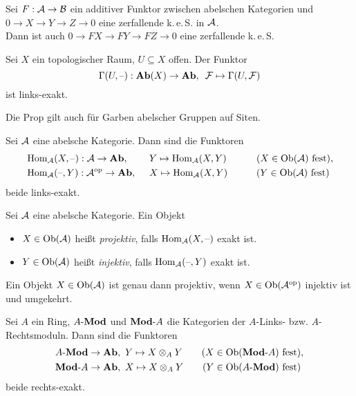\documentclass{cheat-sheet}
\newcommand{\keS}{k.\,e.\,S.} %
\begin{document}
\begin{prop}
  Sei $F : \mathcal{A} \to \mathcal{B}$ ein additiver Funktor zwischen abelschen Kategorien und $0 \to X \to Y \to Z \to 0$ eine zerfallende \keS{} in $\mathcal{A}$. \\
  Dann ist auch $0 \to FX \to FY \to FZ \to 0$ eine zerfallende \keS{}
\end{prop}

\begin{prop}
  Sei $X$ ein topologischer Raum, $U \subseteq X$ offen. Der Funktor
  \[ \Gamma(U, \text{--}) : \mathbf{Ab}(X) \to \mathbf{Ab}, \enspace \mathcal{F} \mapsto \Gamma(U, \mathcal{F}) \]
  ist links-exakt.
\end{prop}

\begin{bem}
  Die Prop gilt auch für Garben abelscher Gruppen auf Siten.
\end{bem}

\begin{prop}
  Sei $\mathcal{A}$ eine abelsche Kategorie. Dann sind die Funktoren
  \begin{alignat*}{5}
    & \operatorname{Hom}_{\mathcal{A}}(X, \text{--}) : \mathcal{A} \to \mathbf{Ab}, \enspace && Y \mapsto \operatorname{Hom}_{\mathcal{A}}(X, Y) \qquad && \text{($X \in \operatorname{Ob}(\mathcal{A})$ fest)}, \\
    & \operatorname{Hom}_{\mathcal{A}}(\text{--}, Y) : \mathcal{A}^{\mathrm{op}} \to \mathbf{Ab}, \enspace && X \mapsto \operatorname{Hom}_{\mathcal{A}}(X, Y) \qquad && \text{($Y \in \operatorname{Ob}(\mathcal{A})$ fest)}
  \end{alignat*}
  beide links-exakt.
\end{prop}

\begin{defn}
  Sei $\mathcal{A}$ eine abelsche Kategorie. Ein Objekt
  \begin{itemize}
    \item $X \in \operatorname{Ob}(\mathcal{A})$ heißt \emph{projektiv}, falls $\operatorname{Hom}_{\mathcal{A}}(X, \text{--})$ exakt ist.
    \item $Y \in \operatorname{Ob}(\mathcal{A})$ heißt \emph{injektiv}, falls $\operatorname{Hom}_{\mathcal{A}}(\text{--}, Y)$ exakt ist.
  \end{itemize}
\end{defn}

\begin{bem}
  Ein Objekt $X \in \operatorname{Ob}(\mathcal{A})$ ist genau dann projektiv, wenn $X \in \operatorname{Ob}(\mathcal{A}^{\mathrm{op}})$ injektiv ist und umgekehrt.
\end{bem}

\begin{prop}
  Sei $A$ ein Ring, ${A}\text{-}\mathbf{Mod}$ und $\mathbf{Mod}\text{-}{A}$ die Kategorien der $A$-Links- bzw. $A$-Rechtsmoduln.
  Dann sind die Funktoren
  \begin{align*}
    {A}\text{-}\mathbf{Mod} \to \mathbf{Ab}, \enspace & Y \mapsto X \otimes_A Y \qquad \text{($X \in \operatorname{Ob}(\mathbf{Mod}\text{-}{A})$ fest)}, \\
    \mathbf{Mod}\text{-}{A} \to \mathbf{Ab}, \enspace & X \mapsto X \otimes_A Y \qquad \text{($Y \in \operatorname{Ob}({A}\text{-}\mathbf{Mod})$ fest)}
  \end{align*}
  beide rechts-exakt.
\end{prop}
\end{document}
